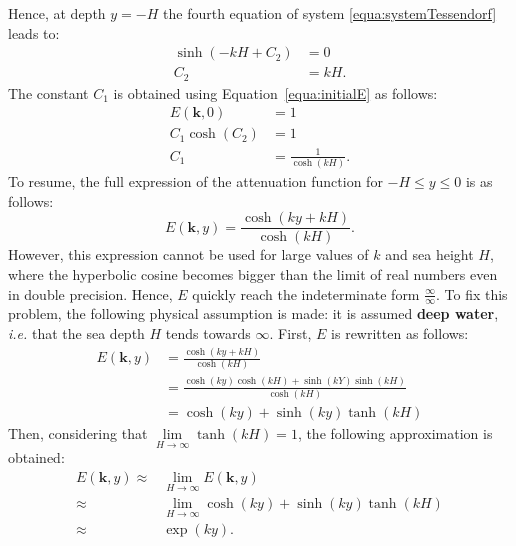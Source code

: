 \documentclass[final]{jcgt}
\def\ie{\emph{i.e.}\xspace}
\begin{document}
Hence, at depth $y=-H$ the fourth equation of system \ref{equa:systemTessendorf} leads to:
\begin{align}
	\sinh(-kH+C_2) & = 0 \nonumber \\
	C_2            & = kH.
\end{align}
The constant $C_1$ is obtained using Equation~\ref{equa:initialE} as follows:
\begin{align}
	E(\mathbf{k},0) & =1\nonumber           \\
	C_1\cosh(C_2)   & =1\nonumber           \\
	C_1             & =\frac{1}{\cosh(kH)}.
\end{align}
To resume, the full expression of the attenuation function for $-H\leq y\leq 0$ is as follows:
\begin{equation}
	E(\mathbf{k}, y)=\frac{\cosh\left(ky+kH\right)}{\cosh(kH)}.
\end{equation}
However, this expression cannot be used for large values of $k$ and sea height $H$, where the hyperbolic cosine becomes bigger than the limit of real numbers even in double precision.
Hence, $E$ quickly reach the indeterminate form $\frac{\infty}{\infty}$.
To fix this problem, the following physical assumption is made: it is assumed \textbf{deep water}, \ie that the sea depth $H$ tends towards $\infty$.
First, $E$ is rewritten as follows:
\begin{align*}
	E(\mathbf{k},y) & = \frac{\cosh(ky+kH)}{\cosh(kH)}\nonumber                            \\
	                & = \frac{\cosh(ky)\cosh(kH) + \sinh(kY)\sinh(kH)}{\cosh(kH)}\nonumber \\
	                & = \cosh(ky) + \sinh(ky)\tanh(kH)
\end{align*}
Then, considering that $\underset{H \rightarrow \infty}{\lim}\tanh(kH)=1$, the following approximation is obtained:
\begin{align}\label{equa:attenuationDeep1}
	E(\mathbf{k},y) \approx & \underset{H \rightarrow \infty}{\lim} E(\mathbf{k},y)\nonumber               \\
	\approx                 & \underset{H \rightarrow \infty}{\lim}\cosh(ky) + \sinh(ky)\tanh(kH)\nonumber \\
	\approx                 & \exp(ky).
\end{align}
\end{document}

